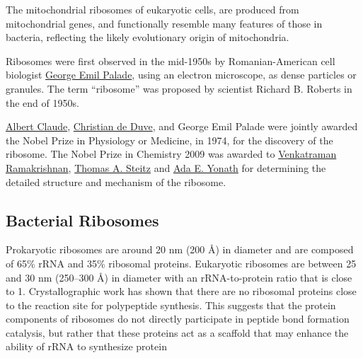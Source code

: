 The mitochondrial ribosomes of eukaryotic cells, are produced from mitochondrial genes, and functionally resemble many features of those in bacteria, reflecting the likely evolutionary origin of mitochondria.

Ribosomes were first observed in the mid-1950s by Romanian-American cell biologist \href{https://en.wikipedia.org/wiki/George_Emil_Palade}{George Emil Palade}, using an electron microscope, as dense particles or granules. The term ``ribosome'' was proposed by scientist Richard B. Roberts in the end of 1950s.

\href{https://en.wikipedia.org/wiki/Albert_Claude}{Albert Claude}, \href{https://en.wikipedia.org/wiki/Christian_de_Duve}{Christian de Duve}, and George Emil Palade were jointly awarded the Nobel Prize in Physiology or Medicine, in 1974, for the discovery of the ribosome. The Nobel Prize in Chemistry 2009 was awarded to \href{https://en.wikipedia.org/wiki/Venki_Ramakrishnan}{Venkatraman Ramakrishnan}, \href{https://en.wikipedia.org/wiki/Thomas_A._Steitz}{Thomas A. Steitz} and \href{https://en.wikipedia.org/wiki/Ada_Yonath}{Ada E. Yonath} for determining the detailed structure and mechanism of the ribosome.

\hypertarget{bacterial-ribosomes}{%
\subsection{Bacterial Ribosomes}\label{bacterial-ribosomes}}

Prokaryotic ribosomes are around 20 nm (200 Å) in diameter and are composed of 65\% rRNA and 35\% ribosomal proteins. Eukaryotic ribosomes are between 25 and 30 nm (250--300 Å) in diameter with an rRNA-to-protein ratio that is close to 1. Crystallographic work has shown that there are no ribosomal proteins close to the reaction site for polypeptide synthesis. This suggests that the protein components of ribosomes do not directly participate in peptide bond formation catalysis, but rather that these proteins act as a scaffold that may enhance the ability of rRNA to synthesize protein



